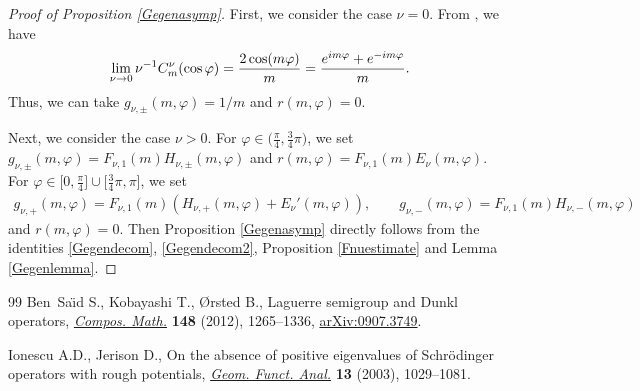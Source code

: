 \documentclass[11pt]{article}
\numberwithin{equation}{section}
\def\f{\varphi}
\def\n{\nu}
\begin{document}
\begin{proof}[Proof of Proposition \ref{Gegenasymp}]
First, we consider the case $\n=0$. From \cite[equation~(4.28)]{BKO}, we have
\begin{align*}
\lim_{\n\to 0}\n^{-1}C_m^{\n}(\cos\f)=\frac{2\cos (m\f)}{m}=\frac{{\rm e}^{{\rm i}m\f}+{\rm e}^{-{\rm i}m\f}}{m}.
\end{align*}
Thus, we can take $g_{\n,\pm}(m,\f)=1/m$ and $r(m,\f)=0$.

Next, we consider the case $\n>0$. For $\f\in \bigl(\frac{\pi}{4}, \frac{3}{4}\pi\bigr)$, we set $g_{\n,\pm}(m,\f)=F_{\n,1}(m)H_{\n,\pm}(m,\f)$ and $r(m,\f)=F_{\n,1}(m)E_{\n}(m,\f)$. For $\f\in \bigl[0,\frac{\pi}{4}\bigr]\cup \bigl[\frac{3}{4}\pi,\pi\bigr]$, we set
\begin{align*}
g_{\n,+}(m,\f)=F_{\n,1}(m)(H_{\n,+}(m,\f)+E_{\n}'(m,\f)),\qquad g_{\n,-}(m,\f)=F_{\n,1}(m)H_{\n,-}(m,\f)
\end{align*}
and $r(m,\f)=0$. Then Proposition \ref{Gegenasymp} directly follows from the identities \eqref{Gegendecom}, \eqref{Gegendecom2}, Proposition \ref{Fnuestimate} and Lemma \ref{Gegenlemma}.
\end{proof}
\begin{thebibliography}{99}
Ben~Sa\"{\i}d S., Kobayashi T., {\O}rsted B., Laguerre semigroup and {D}unkl
 operators, \href{https://doi.org/10.1112/S0010437X11007445}{\textit{Compos. Math.}} \textbf{148} (2012), 1265--1336,
 \href{https://arxiv.org/abs/0907.3749}{arXiv:0907.3749}.

Ionescu A.D., Jerison D., On the absence of positive eigenvalues of
 {S}chr\"odinger operators with rough potentials, \href{https://doi.org/10.1007/s00039-003-0439-2}{\textit{Geom. Funct. Anal.}}
 \textbf{13} (2003), 1029--1081.

\end{thebibliography}
\end{document}
